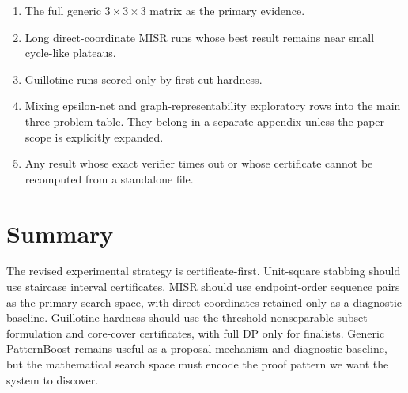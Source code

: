 \documentclass[11pt]{article}
\begin{document}
\begin{enumerate}
\item The full generic $3\times 3\times 3$ matrix as the primary evidence.
\item Long direct-coordinate MISR runs whose best result remains near small
cycle-like plateaus.
\item Guillotine runs scored only by first-cut hardness.
\item Mixing epsilon-net and graph-representability exploratory rows into the
main three-problem table.  They belong in a separate appendix unless the paper
scope is explicitly expanded.
\item Any result whose exact verifier times out or whose certificate cannot be
recomputed from a standalone file.
\end{enumerate}

\section{Summary}

The revised experimental strategy is certificate-first.  Unit-square stabbing
should use staircase interval certificates.  MISR should use endpoint-order
sequence pairs as the primary search space, with direct coordinates retained
only as a diagnostic baseline.  Guillotine hardness should use the threshold
nonseparable-subset formulation and core-cover certificates, with full DP only
for finalists.  Generic PatternBoost remains useful as a proposal mechanism
and diagnostic baseline, but the mathematical search space must encode the
proof pattern we want the system to discover.
\end{document}
